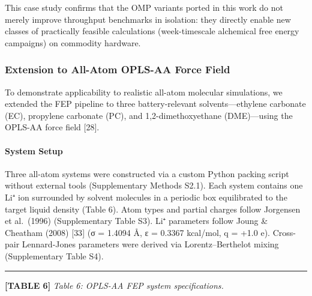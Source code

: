 \documentclass[
  11pt,
]{article}
\begin{document}
This case study confirms that the OMP variants ported in this work do
not merely improve throughput benchmarks in isolation: they directly
enable new classes of practically feasible calculations (week-timescale
alchemical free energy campaigns) on commodity hardware.

\subsubsection{Extension to All-Atom OPLS-AA Force
Field}\label{extension-to-all-atom-opls-aa-force-field}

To demonstrate applicability to realistic all-atom molecular
simulations, we extended the FEP pipeline to three battery-relevant
solvents---ethylene carbonate (EC), propylene carbonate (PC), and
1,2-dimethoxyethane (DME)---using the OPLS-AA force field {[}28{]}.

\paragraph{System Setup}\label{system-setup-1}

Three all-atom systems were constructed via a custom Python packing
script without external tools (Supplementary Methods S2.1). Each system
contains one Li⁺ ion surrounded by solvent molecules in a periodic box
equilibrated to the target liquid density (Table 6). Atom types and
partial charges follow Jorgensen et al.~(1996) (Supplementary Table S3).
Li⁺ parameters follow Joung \& Cheatham (2008) {[}33{]} (σ = 1.4094 Å, ε
= 0.3367 kcal/mol, q = +1.0 e). Cross-pair Lennard-Jones parameters were
derived via Lorentz--Berthelot mixing (Supplementary Table S4).

\begin{center}\rule{0.5\linewidth}{0.5pt}\end{center}

\textbf{{[}TABLE 6{]}} \emph{Table 6: OPLS-AA FEP system
specifications.}
\end{document}
